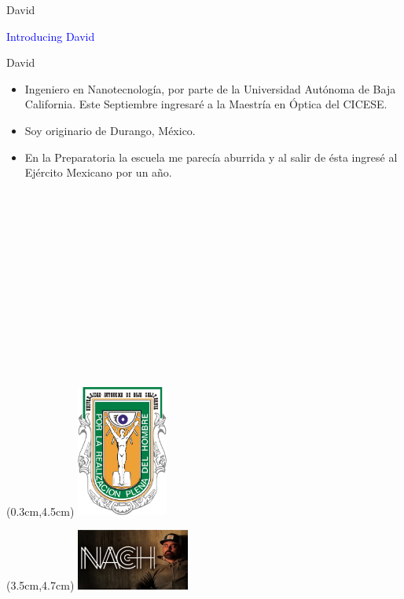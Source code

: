 \documentclass{beamer}
\begin{document}
\begin{frame}{David}
   \begin{center}
      \Huge \textcolor{blue}{Introducing David}
   \end{center}
\end{frame}

\begin{frame}{David}
   \begin{itemize}
      \item Ingeniero en Nanotecnolog\'ia, por parte de la Universidad Aut\'onoma de Baja California. Este Septiembre ingresar\'e a la Maestr\'ia en \'Optica del CICESE.
      \item Soy originario de Durango, M\'exico.
      \item En la Preparatoria la escuela me parec\'ia aburrida y al salir de \'esta ingres\'e al Ej\'ercito Mexicano por un a\~no.
   \end{itemize}
   ~\\~\\~\\~\\~\\~\\~\\~\\~\\~\\~\\~\\
   \begin{textblock*}{\textwidth}(0.3cm,4.5cm) %
      \includegraphics[width=3.0cm]{figures/UABC_logo.jpg}
   \end{textblock*}
   \begin{textblock*}{\textwidth}(3.5cm,4.7cm) %
      \includegraphics[width=3.7cm]{figures/nach.png}
   \end{textblock*}

\end{frame}
\end{document}
